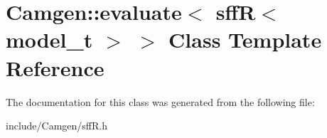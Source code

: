 \hypertarget{a00194}{}\section{Camgen\+:\+:evaluate$<$ sff\+R$<$ model\+\_\+t $>$ $>$ Class Template Reference}
\label{a00194}


The documentation for this class was generated from the following file\+:\begin{DoxyCompactItemize}
\item 
include/\+Camgen/sff\+R.\+h\end{DoxyCompactItemize}
